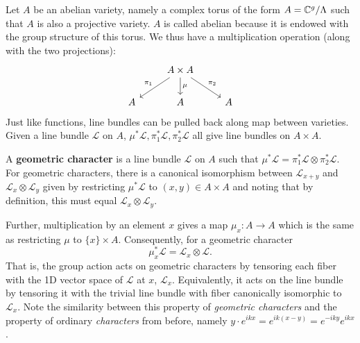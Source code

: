 Let $A$ be an abelian variety, namely a complex torus of the form $A = \mathbb{C}^g/\Lambda$ such that $A$ is also a projective variety. $A$ is called abelian because it is endowed with the group structure of this torus. We thus have a multiplication operation (along with the two projections):
\[
	\begin{tikzcd}
		& A \times A \arrow[ld,swap,"\pi_1"] \arrow[d,"\mu"] \arrow[rd,"\pi_2"]&\\
		A & A & A
	\end{tikzcd}
\]
Just like functions, line bundles can be pulled back along map between varieties. Given a line bundle $\mathcal L$ on $A$, $\mu^* \mathcal L, \pi^*_1 \mathcal L, \pi_2^* \mathcal L$ all give line bundles on $A \times A$.

A \textbf{geometric character} is a line bundle $\mathcal L$ on $A$ such that $\mu^* \mathcal L = \pi_1^* \mathcal L \otimes \pi_2^* \mathcal L$.
For geometric characters, there is a canonical isomorphism between $\mathcal L_{x+y}$ and $\mathcal L_x \otimes \mathcal L_y$ given by restricting $\mu^* \mathcal L$ to $(x,y) \in A \times A$ and noting that by definition, this must equal $\mathcal L_x \otimes \mathcal L_y$.

Further, multiplication by an element $x$ gives a map $\mu_x: A \to A$ which is the same as restricting $\mu$ to $\{x\} \times A$. Consequently, for a geometric character
\[
	\mu_x^* \mathcal L = \mathcal L_x \otimes \mathcal L.
\]
That is, the group action acts on geometric characters by tensoring each fiber with the 1D vector space of $\mathcal L$ at $x$, $\mathcal L_x$. Equivalently, it acts on the line bundle by tensoring it with the trivial line bundle with fiber canonically isomorphic to $\mathcal L_x$. Note the similarity between this property of \emph{geometric characters} and the property of ordinary \emph{characters} from before, namely $y \cdot e^{ikx} = e^{ik(x-y)} = e^{-iky} e^{ikx}$.

